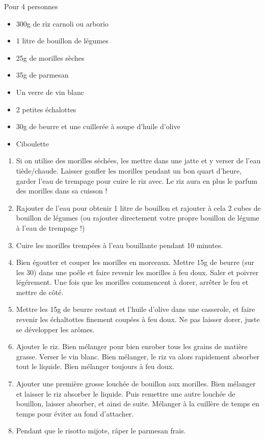 \bigskip
{}
{Pour 4 personnes}{\begin{itemize}
	\item 300g de riz carnoli ou arborio
	\item 1 litre de bouillon de légumes
	\item 25g de morilles sèches
	\item 35g de parmesan
	\item Un verre de vin blanc
	\item 2 petites échalottes
	\item 30g de beurre et une cuillerée à soupe d'huile d'olive
	\item Ciboulette
\end{itemize}}
{\begin{enumerate}
	\item Si on utilise des morilles séchées, les mettre dans une jatte et y verser de l'eau tiède/chaude. Laisser gonfler les morilles pendant un bon quart d'heure, garder l'eau de trempage pour cuire le riz avec. Le riz aura en plus le parfum des morilles dans sa cuisson !
	\item Rajouter de l'eau pour obtenir 1 litre de bouillon et rajouter à cela 2 cubes de bouillon de légumes (ou rajouter directement votre propre bouillon de légume à l'eau de trempage !)
	\item Cuire les morilles trempées à l'eau bouillante pendant 10 minutes.
	\item Bien égoutter et couper les morilles en morceaux. Mettre 15g de beurre (sur les 30) dans une poêle et faire revenir les morilles à feu doux. Saler et poivrer légérement. Une fois que les morilles commencent à dorer, arrêter le feu et mettre de côté.
	\item Mettre les 15g de beurre restant et l'huile d'olive dans une casserole, et faire revenir les échaltottes finement coupées à feu doux. Ne pas laisser dorer, juste se développer les arômes. 
	\item Ajouter le riz. Bien mélanger pour bien enrober tous les grains de matière grasse. Verser le vin blanc. Bien mélanger, le riz va alors rapidement absorber tout le liquide. Bien mélanger toujours à feu doux.
	\item Ajouter une première grosse louchée de bouillon aux morilles. Bien mélanger et laisser le riz absorber le liquide. Puis remettre une autre louchée de bouillon, laisser absorber, et ainsi de suite. Mélanger à la cuillère de temps en temps pour éviter au fond d'attacher.
	\item Pendant que le risotto mijote, râper le parmesan frais. 

\end{enumerate}}

